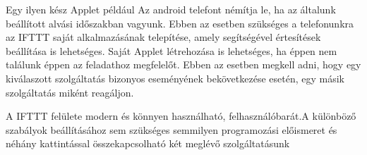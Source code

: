 Egy ilyen kész Applet például Az android telefont némítja le, ha az általunk beállított alvási időszakban vagyunk. Ebben az esetben szükséges a telefonunkra az IFTTT saját alkalmazásának telepítése, amely segítségével értesítések beállítása is lehetséges. Saját Applet létrehozása is lehetséges, ha éppen nem találunk éppen az feladathoz megfelelőt. Ebben az esetben megkell adni, hogy egy kiválaszott szolgáltatás bizonyos eseményének bekövetkezése esetén, egy másik szolgáltatás miként reagáljon.

A IFTTT felülete modern és könnyen használható, felhasználóbarát.A  különböző szabályok beállításához sem szükséges semmilyen programozási előismeret és néhány kattintással összekapcsolható két meglévő szolgáltatásunk

